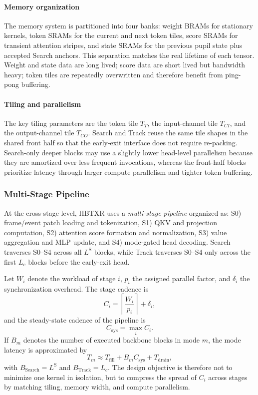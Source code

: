 \documentclass[journal]{IEEEtran}
\begin{document}
\paragraph*{Memory organization}
The memory system is partitioned into four banks: weight BRAMs for stationary kernels, token SRAMs for the current and next token tiles, score SRAMs for transient attention stripes, and state SRAMs for the previous pupil state plus accepted Search anchors. This separation matches the real lifetime of each tensor. Weight and state data are long lived; score data are short lived but bandwidth heavy; token tiles are repeatedly overwritten and therefore benefit from ping-pong buffering.

\paragraph*{Tiling and parallelism}
The key tiling parameters are the token tile $T_T$, the input-channel tile $T_{CI}$, and the output-channel tile $T_{CO}$. Search and Track reuse the same tile shapes in the shared front half so that the early-exit interface does not require re-packing. Search-only deeper blocks may use a slightly lower head-level parallelism because they are amortized over less frequent invocations, whereas the front-half blocks prioritize latency through larger compute parallelism and tighter token buffering.

\subsubsection{Multi-Stage Pipeline}
At the cross-stage level, HBTXR uses a \emph{multi-stage pipeline} organized as: S0) frame/event patch loading and tokenization, S1) QKV and projection computation, S2) attention score formation and normalization, S3) value aggregation and MLP update, and S4) mode-gated head decoding. Search traverses S0--S4 across all $L^{\mathrm S}$ blocks, while Track traverses S0--S4 only across the first $L_c$ blocks before the early-exit head.

Let $W_i$ denote the workload of stage $i$, $p_i$ the assigned parallel factor, and $\delta_i$ the synchronization overhead. The stage cadence is
\begin{equation}
C_i=\left\lceil\frac{W_i}{p_i}\right\rceil+\delta_i,
\end{equation}
and the steady-state cadence of the pipeline is
\begin{equation}
C_{\mathrm{sys}}=\max_i C_i.
\end{equation}
If $B_m$ denotes the number of executed backbone blocks in mode $m$, the mode latency is approximated by
\begin{equation}
T_m \approx T_{\mathrm{fill}} + B_mC_{\mathrm{sys}} + T_{\mathrm{drain}},
\end{equation}
with $B_{\mathrm{Search}}=L^{\mathrm S}$ and $B_{\mathrm{Track}}=L_c$. The design objective is therefore not to minimize one kernel in isolation, but to compress the spread of $C_i$ across stages by matching tiling, memory width, and compute parallelism.
\end{document}
